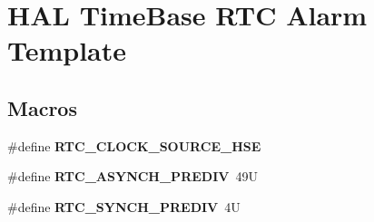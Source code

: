 \hypertarget{group___h_a_l___time_base___r_t_c___alarm___template}{}\section{H\+AL Time\+Base R\+TC Alarm Template}
\label{group___h_a_l___time_base___r_t_c___alarm___template}
\subsection*{Macros}
\begin{DoxyCompactItemize}
\item 
\mbox{\label{group___h_a_l___time_base___r_t_c___alarm___template_ga5da1cd82e5ae713267918a9c85b4dc77}} 
\#define {\bfseries R\+T\+C\+\_\+\+C\+L\+O\+C\+K\+\_\+\+S\+O\+U\+R\+C\+E\+\_\+\+H\+SE}
\item 
\mbox{\label{group___h_a_l___time_base___r_t_c___alarm___template_gac483fb44f1611ddb407a4aacec7ae4e7}} 
\#define {\bfseries R\+T\+C\+\_\+\+A\+S\+Y\+N\+C\+H\+\_\+\+P\+R\+E\+D\+IV}~49U
\item 
\mbox{\label{group___h_a_l___time_base___r_t_c___alarm___template_ga433a49865e4af2e0972e6bbbea894d51}} 
\#define {\bfseries R\+T\+C\+\_\+\+S\+Y\+N\+C\+H\+\_\+\+P\+R\+E\+D\+IV}~4U
\end{DoxyCompactItemize}

